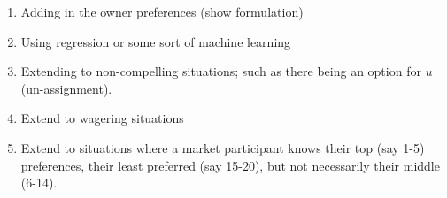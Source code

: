 \begin{enumerate}
\item Adding in the owner preferences (show formulation)

\item Using regression or some sort of machine learning

\item Extending to non-compelling situations; such as there being an option for $u$ (un-assignment).

\item Extend to wagering situations

\item Extend to situations where a market participant knows their top (say 1-5) preferences, their least preferred (say 15-20), but not necessarily their middle (6-14).

\end{enumerate}